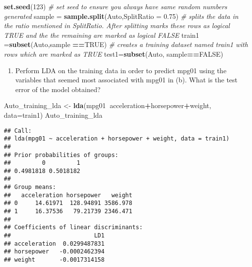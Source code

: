 \documentclass[]{article}
\newenvironment{Shaded}{\begin{snugshade}}{\end{snugshade}}
\newcommand{\KeywordTok}[1]{\textcolor[rgb]{0.13,0.29,0.53}{\textbf{#1}}}
\newcommand{\DataTypeTok}[1]{\textcolor[rgb]{0.13,0.29,0.53}{#1}}
\newcommand{\DecValTok}[1]{\textcolor[rgb]{0.00,0.00,0.81}{#1}}
\newcommand{\FloatTok}[1]{\textcolor[rgb]{0.00,0.00,0.81}{#1}}
\newcommand{\StringTok}[1]{\textcolor[rgb]{0.31,0.60,0.02}{#1}}
\newcommand{\CommentTok}[1]{\textcolor[rgb]{0.56,0.35,0.01}{\textit{#1}}}
\newcommand{\OtherTok}[1]{\textcolor[rgb]{0.56,0.35,0.01}{#1}}
\newcommand{\OperatorTok}[1]{\textcolor[rgb]{0.81,0.36,0.00}{\textbf{#1}}}
\newcommand{\NormalTok}[1]{#1}
\providecommand{\tightlist}{%
  \setlength{\itemsep}{0pt}\setlength{\parskip}{0pt}}
\begin{document}
\begin{Shaded}
\begin{Highlighting}[]
\KeywordTok{set.seed}\NormalTok{(}\DecValTok{123}\NormalTok{) }\CommentTok{#  set seed to ensure you always have same random numbers generated}
\NormalTok{sample =}\StringTok{ }\KeywordTok{sample.split}\NormalTok{(Auto,}\DataTypeTok{SplitRatio =} \FloatTok{0.75}\NormalTok{) }\CommentTok{# splits the data in the ratio mentioned in SplitRatio. After splitting marks these rows as logical TRUE and the the remaining are marked as logical FALSE}
\NormalTok{train1 =}\KeywordTok{subset}\NormalTok{(Auto,sample }\OperatorTok{==}\OtherTok{TRUE}\NormalTok{) }\CommentTok{# creates a training dataset named train1 with rows which are marked as TRUE}
\NormalTok{test1=}\KeywordTok{subset}\NormalTok{(Auto, sample}\OperatorTok{==}\OtherTok{FALSE}\NormalTok{)}
\end{Highlighting}
\end{Shaded}

\begin{enumerate}
\def\labelenumi{(\alph{enumi})}
\setcounter{enumi}{3}
\tightlist
\item
  Perform LDA on the training data in order to predict mpg01 using the
  variables that seemed most associated with mpg01 in (b). What is the
  test error of the model obtained?
\end{enumerate}

\begin{Shaded}
\begin{Highlighting}[]
\NormalTok{Auto_training_lda <-}\StringTok{ }\KeywordTok{lda}\NormalTok{(mpg01}\OperatorTok{~}\NormalTok{acceleration}\OperatorTok{+}\NormalTok{horsepower}\OperatorTok{+}\NormalTok{weight, }\DataTypeTok{data=}\NormalTok{train1)}
\NormalTok{Auto_training_lda}
\end{Highlighting}
\end{Shaded}

\begin{verbatim}
## Call:
## lda(mpg01 ~ acceleration + horsepower + weight, data = train1)
## 
## Prior probabilities of groups:
##         0         1 
## 0.4981818 0.5018182 
## 
## Group means:
##   acceleration horsepower   weight
## 0     14.61971  128.94891 3586.978
## 1     16.37536   79.21739 2346.471
## 
## Coefficients of linear discriminants:
##                        LD1
## acceleration  0.0299487831
## horsepower   -0.0002462394
## weight       -0.0017314158
\end{verbatim}
\end{document}
